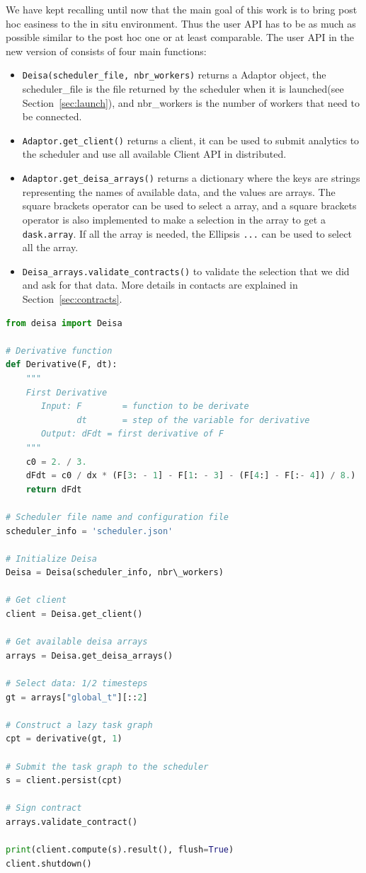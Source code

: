 We have kept recalling until now that the main goal of this work is to bring post hoc easiness to the in situ environment. Thus the user API has to be as much as possible similar to the post hoc one or at least comparable. The user API in the new version of \deisa consists of four main functions: 
\begin{itemize}
    \item \texttt{Deisa(scheduler\_file, nbr\_workers)} returns a \deisa Adaptor object, the scheduler\_file is the file returned by the scheduler when it is launched(see Section~\ref{sec:launch}), and nbr\_workers is the number of workers that need to be connected.  

    \item \texttt{Adaptor.get\_client()} returns a \dask client, it can be used to submit analytics to the scheduler and use all available Client API in \dask distributed.
    
    \item \texttt{Adaptor.get\_deisa\_arrays()} returns a dictionary where the keys are strings representing the names of available data, and the values are \deisa arrays. The square brackets operator can be used to select a \deisa array, and a square brackets operator is also implemented to make a selection in the \deisa array to get a \texttt{dask.array}. If all the array is needed, the Ellipsis \texttt{...} can be used to select all the array.
    
    \item \texttt{Deisa\_arrays.validate\_contracts()} to validate the selection that we did and ask for that data. More details in contacts are explained in Section~\ref{sec:contracts}.
\end{itemize}


\begin{lstlisting}[float, label=listderiv, language=python, caption=In situ incremental temporal derivative]
from deisa import Deisa

# Derivative function
def Derivative(F, dt):
    """
    First Derivative
       Input: F        = function to be derivate
              dt       = step of the variable for derivative
       Output: dFdt = first derivative of F
    """
    c0 = 2. / 3.
    dFdt = c0 / dx * (F[3: - 1] - F[1: - 3] - (F[4:] - F[:- 4]) / 8.)
    return dFdt

# Scheduler file name and configuration file
scheduler_info = 'scheduler.json'

# Initialize Deisa
Deisa = Deisa(scheduler_info, nbr\_workers)

# Get client
client = Deisa.get_client()

# Get available deisa arrays 
arrays = Deisa.get_deisa_arrays()

# Select data: 1/2 timesteps
gt = arrays["global_t"][::2]

# Construct a lazy task graph
cpt = derivative(gt, 1)

# Submit the task graph to the scheduler
s = client.persist(cpt)

# Sign contract
arrays.validate_contract()

print(client.compute(s).result(), flush=True)
client.shutdown()
\end{lstlisting}


